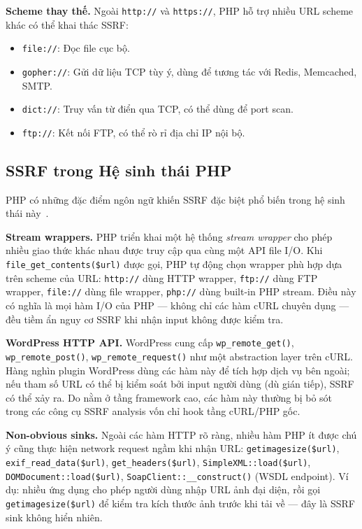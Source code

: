 \textbf{Scheme thay thế.} Ngoài \texttt{http://} và \texttt{https://}, PHP
hỗ trợ nhiều URL scheme khác có thể khai thác SSRF:
\begin{itemize}
    \item \texttt{file://}: Đọc file cục bộ.
    \item \texttt{gopher://}: Gửi dữ liệu TCP tùy ý, dùng để tương tác với
    Redis, Memcached, SMTP.
    \item \texttt{dict://}: Truy vấn từ điển qua TCP, có thể dùng để port
    scan.
    \item \texttt{ftp://}: Kết nối FTP, có thể rò rỉ địa chỉ IP nội bộ.
\end{itemize}

\subsection{SSRF trong Hệ sinh thái PHP}
\label{subsec:ssrf-php}

PHP có những đặc điểm ngôn ngữ khiến SSRF đặc biệt phổ biến trong hệ sinh
thái này~\cite{phpgroup2023history}.

\textbf{Stream wrappers.} PHP triển khai một hệ thống \emph{stream wrapper}
cho phép nhiều giao thức khác nhau được truy cập qua cùng một API file I/O.
Khi \texttt{file\_get\_contents(\$url)} được gọi, PHP tự động chọn wrapper
phù hợp dựa trên scheme của URL: \texttt{http://} dùng HTTP wrapper,
\texttt{ftp://} dùng FTP wrapper, \texttt{file://} dùng file wrapper,
\texttt{php://} dùng built-in PHP stream. Điều này có nghĩa là mọi hàm I/O
của PHP --- không chỉ các hàm cURL chuyên dụng --- đều tiềm ẩn nguy cơ SSRF
khi nhận input không được kiểm tra.

\textbf{WordPress HTTP API.} WordPress cung cấp \texttt{wp\_remote\_get()},
\texttt{wp\_remote\_post()}, \texttt{wp\_remote\_request()} như một abstraction
layer trên cURL. Hàng nghìn plugin WordPress dùng các hàm này để tích hợp
dịch vụ bên ngoài; nếu tham số URL có thể bị kiểm soát bởi input người dùng
(dù gián tiếp), SSRF có thể xảy ra. Do nằm ở tầng framework cao, các hàm
này thường bị bỏ sót trong các công cụ SSRF analysis vốn chỉ hook tầng
cURL/PHP gốc.

\textbf{Non-obvious sinks.} Ngoài các hàm HTTP rõ ràng, nhiều hàm PHP ít được
chú ý cũng thực hiện network request ngầm khi nhận URL:
\texttt{getimagesize(\$url)}, \texttt{exif\_read\_data(\$url)},
\texttt{get\_headers(\$url)}, \texttt{SimpleXML::load(\$url)},
\texttt{DOMDocument::load(\$url)}, \texttt{SoapClient::\_\_construct()} (WSDL
endpoint). Ví dụ: nhiều ứng dụng cho phép người dùng nhập URL ảnh đại diện,
rồi gọi \texttt{getimagesize(\$url)} để kiểm tra kích thước ảnh trước khi
tải về --- đây là SSRF sink không hiển nhiên.

